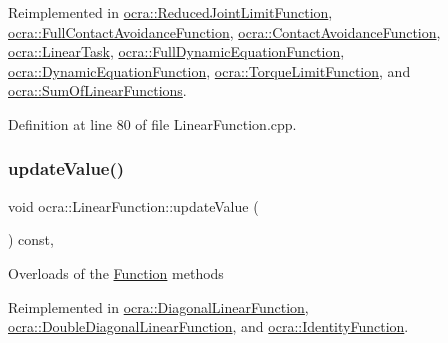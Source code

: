 Reimplemented in \hyperlink{classocra_1_1ReducedJointLimitFunction_a3b2b65be504eda131ad8d00304304fd3}{ocra\+::\+Reduced\+Joint\+Limit\+Function}, \hyperlink{classocra_1_1FullContactAvoidanceFunction_a91b21004faed7ffa6a51e975abc93797}{ocra\+::\+Full\+Contact\+Avoidance\+Function}, \hyperlink{classocra_1_1ContactAvoidanceFunction_aca72dc43ecd3d95bb917139ac6ae19c1}{ocra\+::\+Contact\+Avoidance\+Function}, \hyperlink{classocra_1_1LinearTask_a9d2845b746d3af713458b9246b011328}{ocra\+::\+Linear\+Task}, \hyperlink{group__constraint_ga5b4ea2e9706cd848923c835e2df0eff5}{ocra\+::\+Full\+Dynamic\+Equation\+Function}, \hyperlink{classocra_1_1DynamicEquationFunction_a81d71c87d0f52b3d321614c6219022ad}{ocra\+::\+Dynamic\+Equation\+Function}, \hyperlink{classocra_1_1TorqueLimitFunction_ad33a9f6f6af6edd6b3c0cda6f915336b}{ocra\+::\+Torque\+Limit\+Function}, and \hyperlink{classocra_1_1SumOfLinearFunctions_a4597593267a02c2087ea84a327eae5dc}{ocra\+::\+Sum\+Of\+Linear\+Functions}.



Definition at line 80 of file Linear\+Function.\+cpp.

\hypertarget{classocra_1_1LinearFunction_a1b9fd7a03a8630055c117d19e0ff019a}{}\label{classocra_1_1LinearFunction_a1b9fd7a03a8630055c117d19e0ff019a} 
\subsubsection{\texorpdfstring{update\+Value()}{updateValue()}}
{\footnotesize\ttfamily void ocra\+::\+Linear\+Function\+::update\+Value (\begin{DoxyParamCaption}{ }\end{DoxyParamCaption}) const\hspace{0.3cm}{\ttfamily [protected]}, {\ttfamily [virtual]}}

Overloads of the \hyperlink{classocra_1_1Function}{Function} methods 

Reimplemented in \hyperlink{classocra_1_1DiagonalLinearFunction_a69523347749429dae6ae041326e40d43}{ocra\+::\+Diagonal\+Linear\+Function}, \hyperlink{classocra_1_1DoubleDiagonalLinearFunction_aee6f818b93d5832a21aa439f13510a49}{ocra\+::\+Double\+Diagonal\+Linear\+Function}, and \hyperlink{classocra_1_1IdentityFunction_afd77529674b7b6db3db2542aaeedbb16}{ocra\+::\+Identity\+Function}.



